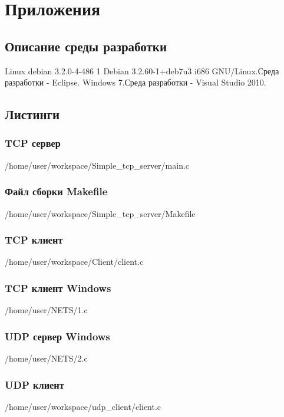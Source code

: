 \documentclass[12pt,a4paper]{report}
\begin{document}
\chapter*{Приложения}
\section*{Описание среды разработки}
Linux debian 3.2.0-4-486 1 Debian 3.2.60-1+deb7u3 i686 GNU/Linux.\newline Среда разработки - Eclipse.\newline
Windows 7.\newline Среда разработки - Visual Studio 2010.
\section*{Листинги}
\subsection*{TCP сервер}

{/home/user/workspace/Simple_tcp_server/main.c}
\subsection*{Файл сборки Makefile}

{/home/user/workspace/Simple_tcp_server/Makefile}
\subsection*{TCP клиент}

{/home/user/workspace/Client/client.c}
\subsection*{TCP клиент Windows}

{/home/user/NETS/1.c}
\subsection*{UDP сервер Windows}

{/home/user/NETS/2.c}
\subsection*{UDP клиент}

{/home/user/workspace/udp_client/client.c}
\end{document}
